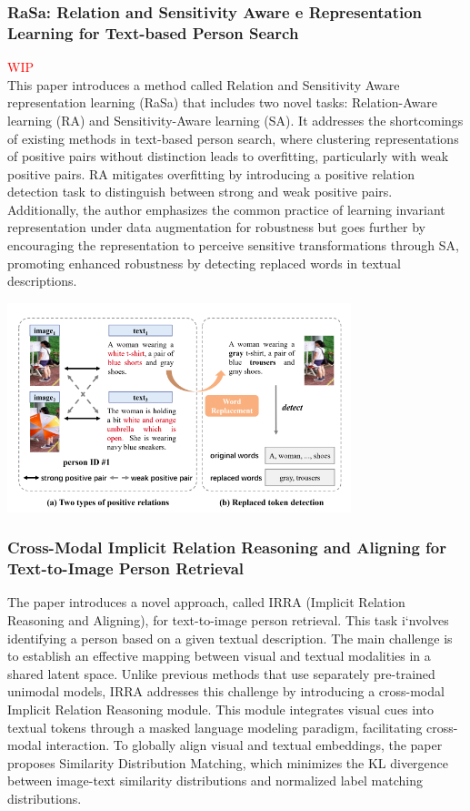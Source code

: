 \subsubsection{RaSa: Relation and Sensitivity Aware e Representation Learning for Text-based Person Search}
\textcolor{red}{WIP}\\
This paper introduces a method called Relation and Sensitivity Aware representation learning (RaSa) that includes two novel tasks: Relation-Aware learning (RA) and Sensitivity-Aware learning (SA). It addresses the shortcomings of existing methods in text-based person search, where clustering representations of positive pairs without distinction leads to overfitting, particularly with weak positive pairs. RA mitigates overfitting by introducing a positive relation detection task to distinguish between strong and weak positive pairs. Additionally, the author emphasizes the common practice of learning invariant representation under data augmentation for robustness but goes further by encouraging the representation to perceive sensitive transformations through SA, promoting enhanced robustness by detecting replaced words in textual descriptions.

\includegraphics[width=10cm]{img/rasa.png}

\subsubsection{Cross-Modal Implicit Relation Reasoning and Aligning for Text-to-Image Person Retrieval}
The paper introduces a novel approach, called IRRA (Implicit Relation Reasoning and Aligning), for text-to-image person retrieval. This task i`nvolves identifying a person based on a given textual description. The main challenge is to establish an effective mapping between visual and textual modalities in a shared latent space. Unlike previous methods that use separately pre-trained unimodal models, IRRA addresses this challenge by introducing a cross-modal Implicit Relation Reasoning module. This module integrates visual cues into textual tokens through a masked language modeling paradigm, facilitating cross-modal interaction. To globally align visual and textual embeddings, the paper proposes Similarity Distribution Matching, which minimizes the KL divergence between image-text similarity distributions and normalized label matching distributions. 

